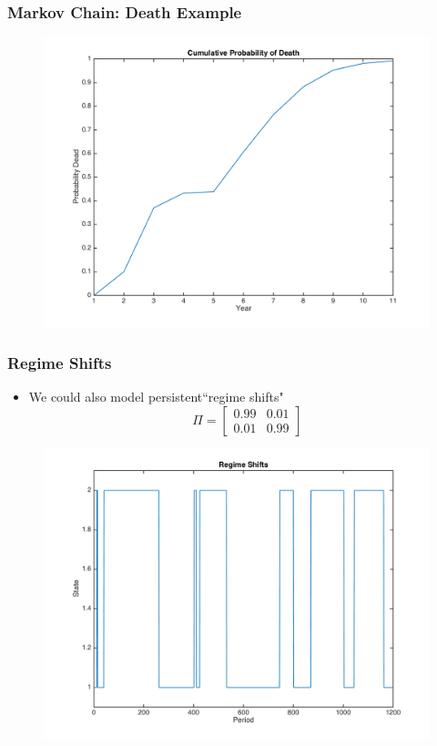 \documentclass{beamer}
\begin{document}
\begin{frame}
\frametitle[alignment=center]{Markov Chain: Death Example}
\begin{figure}
\centering
\includegraphics[scale=0.5]{CumulativeProbDeath.png}
\end{figure}
\end{frame}

\begin{frame}
\frametitle[alignment=center]{Regime Shifts}
\begin{itemize}
\item We could also model persistent``regime shifts"
$$\Pi=\left[\begin{array}{cc}0.99 & 0.01 \\ 0.01 & 0.99\end{array}\right]$$
\end{itemize}
\begin{figure}
\centering
\includegraphics[scale=0.4]{RegimeShifts.png}
\end{figure}
\end{frame}
\end{document}
